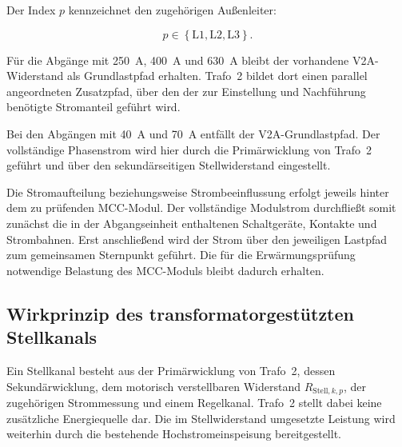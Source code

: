 Der Index \(p\) kennzeichnet den zugehörigen Außenleiter:

\begin{equation}
    p \in
    \left\{
        \mathrm{L1},
        \mathrm{L2},
        \mathrm{L3}
    \right\}.
    \label{eq:definition_phasenindex}
\end{equation}

Für die Abgänge mit \SI{250}{\ampere}, \SI{400}{\ampere} und
\SI{630}{\ampere} bleibt der vorhandene V2A-Widerstand als
Grundlastpfad erhalten. Trafo~2 bildet dort einen parallel
angeordneten Zusatzpfad, über den der zur Einstellung und Nachführung
benötigte Stromanteil geführt wird.

Bei den Abgängen mit \SI{40}{\ampere} und \SI{70}{\ampere} entfällt
der V2A-Grundlastpfad. Der vollständige Phasenstrom wird hier durch
die Primärwicklung von Trafo~2 geführt und über den sekundärseitigen
Stellwiderstand eingestellt.

Die Stromaufteilung beziehungsweise Strombeeinflussung erfolgt jeweils
hinter dem zu prüfenden MCC-Modul. Der vollständige Modulstrom
durchfließt somit zunächst die in der Abgangseinheit enthaltenen
Schaltgeräte, Kontakte und Strombahnen. Erst anschließend wird der
Strom über den jeweiligen Lastpfad zum gemeinsamen Sternpunkt
geführt. Die für die Erwärmungsprüfung notwendige Belastung des
MCC-Moduls bleibt dadurch erhalten.

\begin{center}
\end{center}



\subsection{Wirkprinzip des transformatorgestützten Stellkanals}
\label{sec:wirkprinzip_trafo2}

Ein Stellkanal besteht aus der Primärwicklung von Trafo~2, dessen
Sekundärwicklung, dem motorisch verstellbaren Widerstand
\(R_{\mathrm{Stell},k,p}\), der zugehörigen Strommessung und einem
Regelkanal. Trafo~2 stellt dabei keine zusätzliche Energiequelle dar.
Die im Stellwiderstand umgesetzte Leistung wird weiterhin durch die
bestehende Hochstromeinspeisung bereitgestellt.

